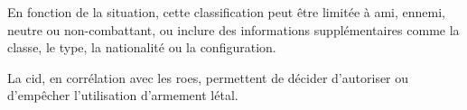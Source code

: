\begin{e1}
{		En fonction de la situation, cette classification peut être limitée à ami, ennemi, neutre ou non-combattant, ou inclure des informations supplémentaires comme la classe, le type, la nationalité ou la configuration.
		
		La \gls{cid}, en corrélation avec les \glspl{roe}, permettent de décider d'autoriser ou d'empêcher l'utilisation d'armement létal.
	}
	
\end{e1}

